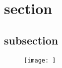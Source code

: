 \documentclass[a4paper]{jsarticle}
\begin{document}
\title{}
\author{松崎　黎}
\maketitle

\section{section}
\subsection{subsection}

\begin{figure}[h]
 \begin{center}
  \texttt{[image: ]}
  \caption{}
  \label{}
 \end{center}
\end{figure}



\end{document}
